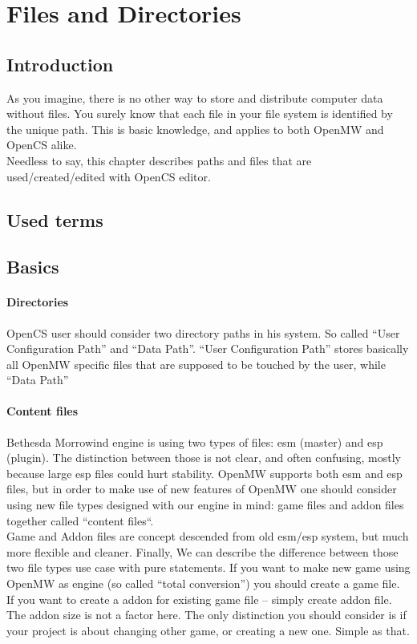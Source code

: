 \section{Files and Directories}
\subsection{Introduction}
As you imagine, there is no other way to store and distribute computer data without files. You surely know that each file in your file system is identified by the unique path. This is basic knowledge, and applies to both Open{MW} and Open{CS} alike.\\

Needless to say, this chapter describes paths and files that are used/created/edited with OpenCS editor.\\

\subsection{Used terms} %

\subsection{Basics}

\paragraph{Directories}
Open{CS} user should consider two directory paths in his system. So called ``User Configuration Path'' and ``Data Path''. ``User Configuration Path'' stores basically all Open{MW} specific files that are supposed to be touched by the user, while ``Data Path''%

\paragraph{Content files}
Bethesda Morrowind engine is using two types of files: esm (master) and esp (plugin). The distinction between those is not clear, and often confusing, mostly because large esp files could hurt stability. Open{MW} supports both esm and esp files, but in order to make use of new features of OpenMW one should consider using new file types designed with our engine in mind: game files and addon files together called ``content files``.\\

Game and Addon files are concept descended from old esm/esp system, but much more flexible and cleaner. Finally, We can describe the difference between those two file types use case with pure statements. If you want to make new game using Open{MW} as engine (so called ``total conversion'') you should create a game file. If you want to create a addon for existing game file -- simply create addon file. The addon size is not a factor here. The only distinction you should consider is if your project is about changing other game, or creating a new one. Simple as that.\\

